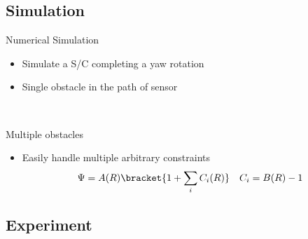 \subsection*{Simulation}

\begin{frame}{Numerical Simulation} %

\begin{itemize}
    \item Simulate a S/C completing a yaw rotation
    \item Single obstacle in the path of sensor
\end{itemize}

\begin{center}
    ~
\end{center}

\end{frame}%

\begin{frame}{Multiple obstacles}%

\begin{itemize}
    \item Easily handle multiple arbitrary constraints 
    \begin{align*}
        \Psi = A(R) \bracket{1 + \sum_i C_i(R)} \quad C_i = B(R) - 1
    \end{align*}
\end{itemize}

\begin{figure}
    \centering
\end{figure}

\end{frame}%

\subsection*{Experiment}

